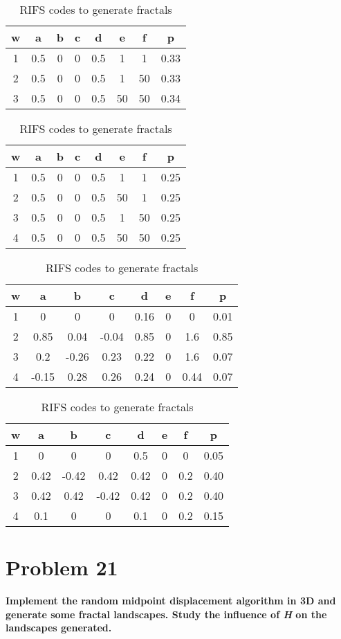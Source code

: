 \begin{table}[ht]
\caption{RIFS codes to generate fractals} 
\centering 
\begin{tabular}{c c c c c c c c} 
\hline\hline 
w & a & b & c & d & e & f & p\\ [0.5ex] 
\hline 
1 & 0.5 & 0 & 0 & 0.5 & 1 & 1 & 0.33 \\
2 & 0.5 & 0 & 0 & 0.5 & 1 & 50 & 0.33\\
3 & 0.5 & 0 & 0 & 0.5 & 50 & 50 & 0.34 \\
\hline %
\end{tabular}
\bigskip
{}
\centering 
\begin{tabular}{c c c c c c c c} 
\hline\hline 
w & a & b & c & d & e & f & p\\ [0.5ex] 
\hline 
1 & 0.5 & 0 & 0 & 0.5 & 1 & 1 & 0.25\\
2 & 0.5 & 0 & 0 & 0.5 & 50 & 1 & 0.25\\
3 & 0.5 & 0 & 0 & 0.5 & 1 & 50 & 0.25\\
4 & 0.5 & 0 & 0 & 0.5 & 50 & 50 & 0.25\\
\hline %
\end{tabular}
\bigskip
{}
\centering 
\begin{tabular}{c c c c c c c c} 
\hline\hline 
w & a & b & c & d & e & f & p\\ [0.5ex] 
\hline 
1 & 0 & 0 & 0 & 0.16 & 0 & 0 & 0.01 \\
2 & 0.85 & 0.04 & -0.04 & 0.85 & 0 & 1.6 & 0.85\\
3 & 0.2 & -0.26 & 0.23 & 0.22 & 0 & 1.6 & 0.07 \\
4 & -0.15 & 0.28 & 0.26 & 0.24 & 0 & 0.44 & 0.07 \\
\hline %
\end{tabular}
\bigskip
{}
\centering 
\begin{tabular}{c c c c c c c c} 
\hline\hline 
w & a & b & c & d & e & f & p\\ [0.5ex] 
\hline 
1 & 0 & 0 & 0 & 0.5 & 0 & 0 & 0.05 \\
2 & 0.42 & -0.42 & 0.42 & 0.42 & 0 & 0.2 & 0.40\\
3 & 0.42 & 0.42 & -0.42 & 0.42 & 0 & 0.2 & 0.40\\
4 & 0.1 & 0 & 0 & 0.1 & 0 & 0.2 & 0.15 \\
\hline %
\end{tabular}
\end{table} \label{table:RIFS} %


\section{ Problem 21 }
\textbf{ Implement the random midpoint displacement algorithm in 3D and generate some fractal landscapes. Study the influence of \textit{H} on the landscapes generated. }